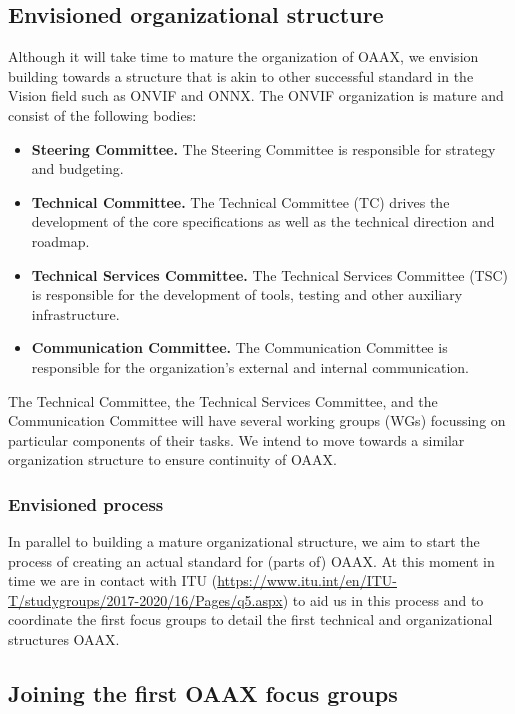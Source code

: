 \documentclass{article}
\begin{document}
\subsection{Envisioned organizational structure}

Although it will take time to mature the organization of OAAX, we envision building towards a structure that is akin to other successful standard in the Vision field such as ONVIF and ONNX. The ONVIF organization is mature and consist of the following bodies:

\begin{itemize}
\item \textbf{Steering Committee.} The Steering Committee is responsible for strategy and budgeting.
\item \textbf{Technical Committee.} The Technical Committee (TC) drives the development of the core specifications as well as the technical direction and roadmap.
\item \textbf{Technical Services Committee.} The Technical Services Committee (TSC) is responsible for the development of tools, testing and other auxiliary infrastructure.
\item \textbf{Communication Committee.} The Communication Committee is responsible for the organization’s external and internal communication.
\end{itemize}

The Technical Committee, the Technical Services Committee, and the Communication Committee will have several working groups (WGs) focussing on particular components of their tasks. We intend to move towards a similar organization structure to ensure continuity of OAAX.

\subsubsection{Envisioned process}

In parallel to building a mature organizational structure, we aim to start the process of creating an actual standard for (parts of) OAAX. At this moment in time we are in contact with ITU (\href{https://www.itu.int/en/ITU-T/studygroups/2017-2020/16/Pages/q5.aspx}{https://www.itu.int/en/ITU-T/studygroups/2017-2020/16/Pages/q5.aspx}) to aid us in this process and to coordinate the first focus groups to detail the first technical and organizational structures OAAX.

\subsection{Joining the first OAAX  focus groups}
\end{document}
